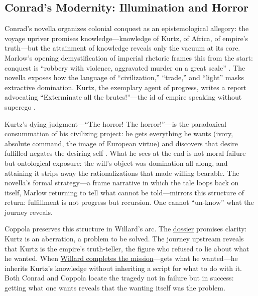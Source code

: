 \subsection*{Conrad's Modernity: Illumination and Horror}
\label{ssec:conrad-s-modernity-illumination-and-horror}
Conrad's novella organizes colonial conquest as an epistemological allegory: the voyage upriver
promises knowledge—knowledge of Kurtz, of Africa, of empire's truth—but the attainment of
knowledge reveals only the vacuum at its core. Marlow's opening demystification of imperial
rhetoric frames this from the start: conquest is ``robbery with violence, aggravated murder on
a great scale'' \parencite{ConradHOD1990}. The novella exposes how the language of
``civilization,'' ``trade,'' and ``light'' masks extractive domination. Kurtz, the exemplary
agent of progress, writes a report advocating ``Exterminate all the brutes!''—the id of empire
speaking without superego \parencite{ConradHOD1990}.

Kurtz's dying judgment---``The horror! The horror!''---is the paradoxical consummation of his
civilizing project: he gets everything he wants (ivory, absolute command, the image of European
virtue) and discovers that desire fulfilled negates the desiring self \parencite{ConradHOD1990}.
What he sees at the end is not moral failure but ontological exposure: the will's object was
domination all along, and attaining it strips away the rationalizations that made willing
bearable. The novella's formal strategy---a frame narrative in which the tale loops back on
itself, Marlow returning to tell what cannot be told—mirrors this structure of return:
fulfillment is not progress but recursion. One cannot ``un-know'' what the journey reveals.

Coppola preserves this structure in Willard's arc. The \hyperref[scene:briefing]{dossier}
promises clarity: Kurtz is an aberration, a problem to be solved. The journey upstream reveals
that Kurtz is the empire's truth-teller, the figure who refused to lie about what he wanted.
When \hyperref[scene:assassination]{Willard completes the mission}—gets what he wanted—he
inherits Kurtz's knowledge without inheriting a script for what
to do with it. Both Conrad and Coppola locate the tragedy not in failure but in success:
getting what one wants reveals that the wanting itself was the problem.
